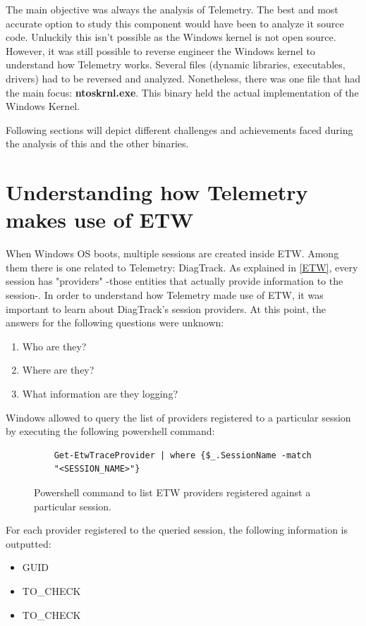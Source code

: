 The main objective was always the analysis of Telemetry. The best and most accurate option to study this component would have been to analyze it source code. Unluckily this isn't possible as the Windows kernel is not open source. However, it was still possible to reverse engineer the Windows kernel to understand how Telemetry works. 
Several files (dynamic libraries, executables, drivers) had to be reversed and analyzed. Nonetheless, there was one file that had the main focus: {\bfseries ntoskrnl.exe}. This binary held the actual implementation of the Windows Kernel.

Following sections will depict different challenges and achievements faced during the analysis of this and the other binaries.




\section{Understanding how Telemetry makes use of ETW}\label{understanding_telemetry_etw}

When Windows OS boots, multiple sessions are created inside ETW. Among them there is one related to Telemetry: DiagTrack. As explained in \ref{ETW}, every session has "providers" -those entities that actually provide information to the session-. In order to understand how Telemetry made use of ETW, it was important to learn about DiagTrack's session providers. At this point, the answers for the following questions were unknown:
\begin{enumerate}
\setlength\itemsep{0.05em}
\item Who are they?
\item Where are they?
\item What information are they logging?
\end{enumerate}

Windows allowed to query the list of providers registered to a particular session by executing the following powershell command: 

\begin{figure}[H]
  \begin{lstlisting}
    Get-EtwTraceProvider | where {$_.SessionName -match 
    "<SESSION_NAME>"}
  \end{lstlisting} 
  \caption[]{Powershell command to list ETW providers registered against a particular session. }
  \label{fig:powershell_cmd}
\end{figure}
For each provider registered to the queried session, the following information is outputted:
\begin{itemize}
  \setlength\itemsep{0.05em}
  \item GUID
  \item TO\_CHECK
  \item TO\_CHECK
\end{itemize}

